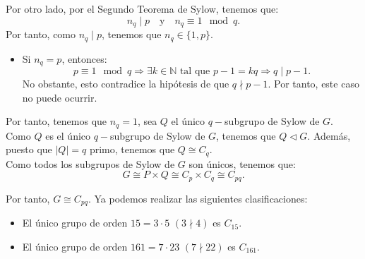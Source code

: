 \begin{ejercicio}
    Por otro lado, por el Segundo Teorema de Sylow, tenemos que:
    \begin{equation*}
        n_q\mid p \quad \text{y} \quad n_q \equiv 1 \mod q.
    \end{equation*}
    Por tanto, como $n_q\mid p$, tenemos que $n_q\in \{1, p\}$.
    \begin{itemize}
        \item Si \(n_q = p\), entonces:
        \begin{equation*}
            p\equiv 1 \mod q
            \Longrightarrow \exists k\in \mathbb{N}\text{ tal que } p-1 = kq
            \Longrightarrow q\mid p-1.
        \end{equation*}
        No obstante, esto contradice la hipótesis de que \(q \nmid p - 1\). Por tanto, este caso no puede ocurrir.
    \end{itemize}
    Por tanto, tenemos que \(n_q = 1\), sea \(Q\) el único \(q-\)subgrupo de Sylow de \(G\). Como \(Q\) es el único \(q-\)subgrupo de Sylow de \(G\), tenemos que \(Q\lhd G\). Además, puesto que \(|Q|=q\) primo, tenemos que $Q\cong C_q$.\\

    Como todos los subgrupos de Sylow de \(G\) son únicos, tenemos que:
    \begin{equation*}
        G\cong P\times Q\cong C_p\times C_q \cong C_{pq}.
    \end{equation*}

    Por tanto, \(G\cong C_{pq}\). Ya podemos realizar las siguientes clasificaciones:
    \begin{itemize}
        \item El único grupo de orden \(15=3\cdot 5\) $(3\nmid 4)$ es \(C_{15}\).
        \item El único grupo de orden \(161=7\cdot 23\) $(7\nmid 22)$ es \(C_{161}\).
    \end{itemize}

\end{ejercicio}

